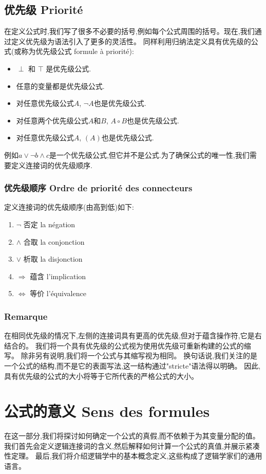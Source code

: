 \documentclass[12pt, a4paper, oneside]{ctexbook}
\begin{document}
  \subsection{优先级 Priorité}
  在定义公式时,我们写了很多不必要的括号,例如每个公式周围的括号。现在,我们通过定义优先级为语法引入了更多的灵活性。
  同样利用归纳法定义具有优先级的公式(或称为优先级公式 formule à priorité):
  \begin{itemize}
    \item $\perp $ 和 $\top $ 是优先级公式.
    \item 任意的变量都是优先级公式.
    \item 对任意优先级公式$A$, $\lnot A$也是优先级公式.
    \item 对任意两个优先级公式$A$和$B$, $A\circ B$也是优先级公式.
    \item 对任意优先级公式$A$, $(A)$也是优先级公式.
  \end{itemize}
  例如$a\lor \lnot b\land c$是一个优先级公式,但它并不是公式.为了确保公式的唯一性,我们需要定义连接词的优先级顺序.
  \subsubsection{优先级顺序 Ordre de priorité des connecteurs}
  定义连接词的优先级顺序(由高到低)如下:
  \begin{enumerate}
    \item $\lnot$ 否定 la négation
    \item $\land$ 合取 la conjonction
    \item $\lor$  析取 la disjonction
    \item $\Rightarrow$ 蕴含 l'implication
    \item $\Leftrightarrow$ 等价 l'équivalence
  \end{enumerate}
  \subsubsection{Remarque}
  在相同优先级的情况下,左侧的连接词具有更高的优先级,但对于蕴含操作符,它是右结合的。
  我们将一个具有优先级的公式视为使用优先级可重新构建的公式的缩写。
  除非另有说明,我们将一个公式与其缩写视为相同。
  换句话说,我们关注的是一个公式的结构,而不是它的表面写法,这一结构通过"stricte"语法得以明确。
  因此,具有优先级的公式的大小将等于它所代表的严格公式的大小。
  \section{公式的意义 Sens des formules}
  在这一部分,我们将探讨如何确定一个公式的真假,而不依赖于为其变量分配的值。
  我们首先会定义逻辑连接词的含义,然后解释如何计算一个公式的真值,并展示紧凑性定理。
  最后,我们将介绍逻辑学中的基本概念定义,这些构成了逻辑学家们的通用语言。
\end{document}
